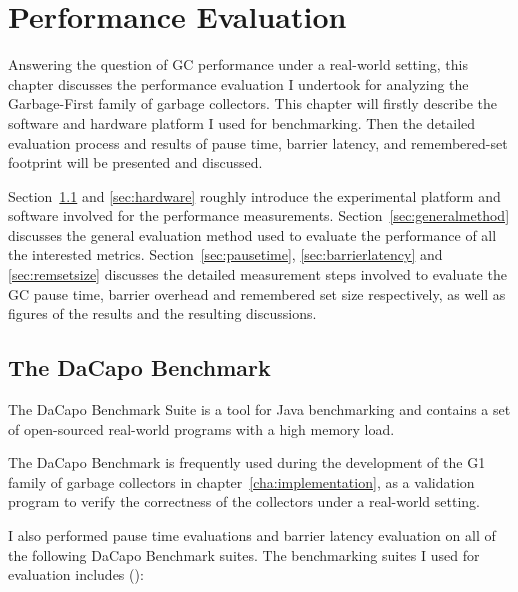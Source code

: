 \chapter{Performance Evaluation}
\label{cha:evaluation}

Answering the question of GC performance under a real-world setting,
this chapter discusses the performance evaluation I undertook for analyzing
the Garbage-First family of garbage collectors.
This chapter will firstly describe the software and hardware platform I used for benchmarking.
Then the detailed evaluation process and results of pause time,
barrier latency, and remembered-set footprint will be presented and discussed.

Section~\ref{sec:dacapo} and \ref{sec:hardware} roughly introduce the experimental
platform and software involved for the performance measurements.
Section~\ref{sec:generalmethod} discusses the general evaluation method used to
evaluate the performance of all the interested metrics.
Section~\ref{sec:pausetime}, \ref{sec:barrierlatency} and \ref{sec:remsetsize} discusses the detailed
measurement steps involved to evaluate the GC pause time, barrier overhead and remembered set size
respectively, as well
as figures of the results and the resulting discussions.

\section{The DaCapo Benchmark} %
\label{sec:dacapo}

The DaCapo Benchmark Suite is a tool for Java benchmarking and contains a set of
open-sourced real-world programs with a high memory load.

The DaCapo Benchmark is frequently used during the development of the G1 family
of garbage collectors in chapter~\ref{cha:implementation}, as a validation program
to verify the correctness of the collectors under a real-world setting.

I also performed pause time evaluations and barrier latency evaluation
on all of the following DaCapo Benchmark suites.
The benchmarking suites I used for evaluation includes (\cite{Blackburn:2006:DBJ:1167515.1167488}):

